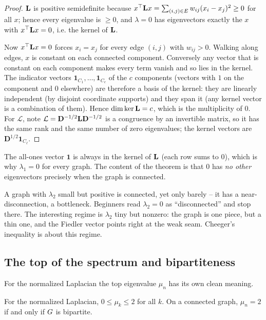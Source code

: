 \begin{proof}
$\mathbf{L}$ is positive semidefinite because $x^\top\mathbf{L} x=\sum_{(i,j)\in E}w_{ij}(x_i-x_j)^2\ge 0$ for all $x$; hence every eigenvalue is $\ge 0$, and $\lambda=0$ has eigenvectors exactly the $x$ with $x^\top\mathbf{L} x=0$, i.e. the kernel of $\mathbf{L}$.

Now $x^\top\mathbf{L} x=0$ forces $x_i=x_j$ for every edge $(i,j)$ with $w_{ij}>0$. Walking along edges, $x$ is constant on each connected component. Conversely any vector that is constant on each component makes every term vanish and so lies in the kernel. The indicator vectors $\mathbf{1}_{C_1},\dots,\mathbf{1}_{C_c}$ of the $c$ components (vectors with $1$ on the component and $0$ elsewhere) are therefore a basis of the kernel: they are linearly independent (by disjoint coordinate supports) and they span it (any kernel vector is a combination of them). Hence $\dim\ker\mathbf{L}=c$, which is the multiplicity of $0$. For $\mathcal{L}$, note $\mathcal{L}=\mathbf{D}^{-1/2}\mathbf{L}\mathbf{D}^{-1/2}$ is a congruence by an invertible matrix, so it has the same rank and the same number of zero eigenvalues; the kernel vectors are $\mathbf{D}^{1/2}\mathbf{1}_{C_\ell}$.
\end{proof}

The all-ones vector $\mathbf{1}$ is always in the kernel of $\mathbf{L}$ (each row sums to $0$), which is why $\lambda_1=0$ for every graph. The content of the theorem is that $0$ has \emph{no other} eigenvectors precisely when the graph is connected.

\begin{trapbox}
A graph with $\lambda_2$ small but positive is connected, yet only barely -- it has a near-disconnection, a bottleneck. Beginners read $\lambda_2=0$ as ``disconnected'' and stop there. The interesting regime is $\lambda_2$ tiny but nonzero: the graph is one piece, but a thin one, and the Fiedler vector points right at the weak seam. Cheeger's inequality is about this regime.
\end{trapbox}

\subsection{The top of the spectrum and bipartiteness}

For the normalized Laplacian the top eigenvalue $\mu_n$ has its own clean meaning.

\begin{lemma}
\label{ch32:mu-le-2}
For the normalized Laplacian, $0\le\mu_k\le 2$ for all $k$. On a connected graph, $\mu_n=2$ if and only if $G$ is bipartite.
\end{lemma}

